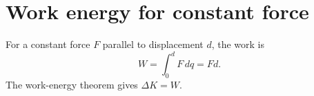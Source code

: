 %
%
%
%

\section*{Work energy for constant force}
For a constant force $F$ parallel to displacement $d$, the work is
\[
  W = \int_0^d F\,dq = Fd.
\]
The work-energy theorem gives $\Delta K=W$.
